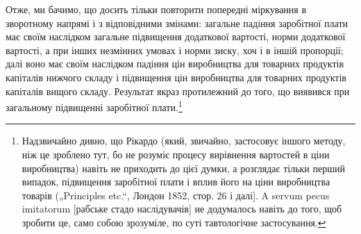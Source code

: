 Отже, ми бачимо, що досить тільки повторити попередні міркування в зворотному
напрямі і з відповідними змінами: загальне падіння заробітної плати має своїм
наслідком загальне підвищення додаткової вартості, норми додаткової вартості, а
при інших незмінних умовах і норми зиску, хоч і в
іншій пропорції; далі воно має своїм наслідком падіння цін виробництва для
товарних продуктів капіталів нижчого складу і підвищення цін виробництва для
товарних продуктів капіталів вищого складу. Результат якраз протилежний до того,
що  виявився при загальному підвищенні заробітної плати.\footnote{
Надзвичайно дивно, що Рікардо (який, звичайно, застосовує іншого
методу, ніж це зроблено тут, бо не розуміє процесу вирівнення вартостей в ціни
виробництва) навіть не приходить до цієї думки, а розглядає тільки перший
випадок, підвищення заробітної плати і вплив його на ціни виробництва товарів
(„Principles etc.“, Лондон 1852, стор. 26 і далі]. A servum pecus
imitatorum [рабське стадо наслідувачів] не додумалось навіть до того, щоб
зробити це, само собою зрозуміле, по суті тавтологічне застосування.
}
\parbreak{}  %
